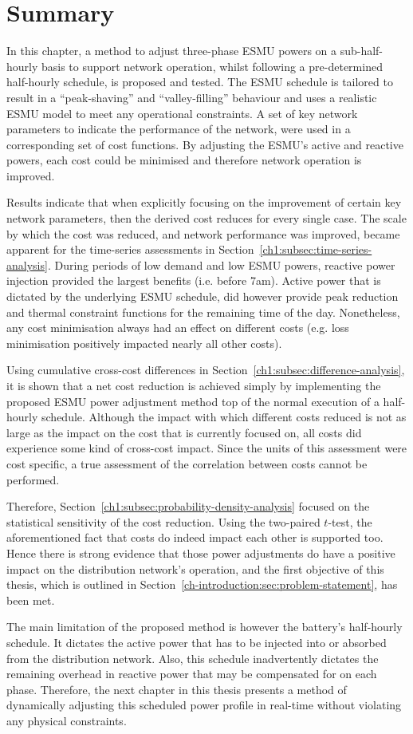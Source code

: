 \section{Summary}
\label{ch1:sec:summary}

In this chapter, a method to adjust three-phase ESMU powers on a sub-half-hourly basis to support network operation, whilst following a pre-determined half-hourly schedule, is proposed and tested.
The ESMU schedule is tailored to result in a ``peak-shaving'' and ``valley-filling'' behaviour and uses a realistic ESMU model to meet any operational constraints.
A set of key network parameters to indicate the performance of the network, were used in a corresponding set of cost functions.
By adjusting the ESMU's active and reactive powers, each cost could be minimised and therefore network operation is improved.

Results indicate that when explicitly focusing on the improvement of certain key network parameters, then the derived cost reduces for every single case.
The scale by which the cost was reduced, and network performance was improved, became apparent for the time-series assessments in Section~\ref{ch1:subsec:time-series-analysis}.
During periods of low demand and low ESMU powers, reactive power injection provided the largest benefits (i.e. before 7am).
Active power that is dictated by the underlying ESMU schedule, did however provide peak reduction and thermal constraint functions for the remaining time of the day.
Nonetheless, any cost minimisation always had an effect on different costs (e.g. loss minimisation positively impacted nearly all other costs).

Using cumulative cross-cost differences in Section~\ref{ch1:subsec:difference-analysis}, it is shown that a net cost reduction is achieved simply by implementing the proposed ESMU power adjustment method top of the normal execution of a half-hourly schedule.
Although the impact with which different costs reduced is not as large as the impact on the cost that is currently focused on, all costs did experience some kind of cross-cost impact.
Since the units of this assessment were cost specific, a true assessment of the correlation between costs cannot be performed.

Therefore, Section~\ref{ch1:subsec:probability-density-analysis} focused on the statistical sensitivity of the cost reduction.
Using the two-paired $t$-test, the aforementioned fact that costs do indeed impact each other is supported too.
Hence there is strong evidence that those power adjustments do have a positive impact on the distribution network's operation, and the first objective of this thesis, which is outlined in Section~\ref{ch-introduction:sec:problem-statement}, has been met.

The main limitation of the proposed method is however the battery's half-hourly schedule.
It dictates the active power that has to be injected into or absorbed from the distribution network.
Also, this schedule inadvertently dictates the remaining overhead in reactive power that may be compensated for on each phase.
Therefore, the next chapter in this thesis presents a method of dynamically adjusting this scheduled power profile in real-time without violating any physical constraints.
